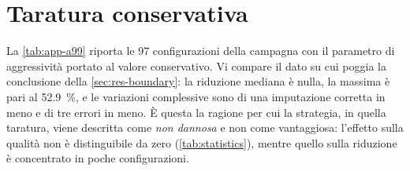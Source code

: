 \section{Taratura conservativa}\label{sec:app-a99}

La \autoref{tab:app-a99} riporta le \num{97} configurazioni della campagna con il parametro di
aggressività portato al valore conservativo. Vi compare il dato su cui poggia la conclusione della
\autoref{sec:res-boundary}: la riduzione mediana è nulla, la massima è pari al
\SI{52.9}{\percent}, e le variazioni complessive sono di una imputazione corretta in meno e di tre
errori in meno. È questa la ragione per cui la strategia, in quella taratura, viene descritta come
\emph{non dannosa} e non come vantaggiosa: l'effetto sulla qualità non è distinguibile da zero
(\autoref{tab:statistics}), mentre quello sulla riduzione è concentrato in poche configurazioni.
